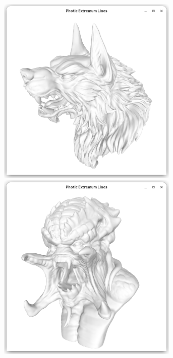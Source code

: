 \documentclass[9pt,fleqn,twoside,twocolumn]{stdglobal}
\begin{document}
\begin{figure}
\begin{subfigure}[t]{0.19\textwidth}
        \includegraphics[width=0.95\textwidth,trim={15px 15 15 50},clip]{images/results/werewolf.png}
        \includegraphics[width=0.95\textwidth,trim={15px 15 15 50},clip]{images/results/predator.png}

\end{subfigure}
\end{figure}
\end{document}
